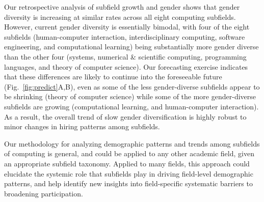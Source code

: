 \documentclass[reprint, twocolumn, aps, nofootinbib, superscriptaddress, longbibliography]{revtex4-1}
\begin{document}

Our retrospective analysis of subfield growth and gender shows that gender diversity is increasing at similar rates across all eight computing subfields. However, current gender diversity is essentially bimodal, with four of the eight subfields (human-computer interaction, interdisciplinary computing, software engineering, and computational learning) being substantially more gender diverse than the other four (systems, numerical \& scientific computing, programming languages, and theory of computer science). Our forecasting exercise indicates that these differences are likely to continue into the foreseeable future (Fig.~\ref{fig:predict}A,B), even as some of the less gender-diverse subfields appear to be shrinking (theory of computer science) while some of the more gender-diverse subfields are growing (computational learning, and human-computer interaction). As a result, the overall trend of slow gender diversification is highly robust to minor changes in hiring patterns among subfields. 

Our methodology for analyzing demographic patterns and trends among subfields of computing is general, and could be applied to any other academic field, given an appropriate subfield taxonomy. Applied to many fields, this approach could elucidate the systemic role that subfields play in driving field-level demographic patterns, and help identify new insights into field-specific systematic barriers to broadening participation. 
\end{document}
